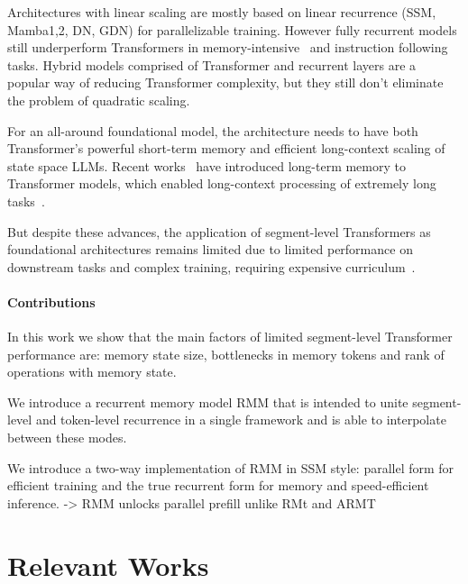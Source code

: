 \documentclass[11pt]{article}
\begin{document}
Architectures with linear scaling are mostly based on linear recurrence (SSM, Mamba1,2, DN, GDN) for parallelizable training. However fully recurrent models still underperform Transformers in memory-intensive~\citep{state tracking, copying} and instruction following~\citep{Can Mamba Learn How to Learn} tasks. Hybrid models comprised of Transformer and recurrent layers are a popular way of reducing Transformer complexity, but they still don't eliminate the problem of quadratic scaling.

For an all-around foundational model, the architecture needs to have both Transformer's powerful short-term memory and efficient long-context scaling of state space LLMs. Recent works~\citep{TrXL, Compressive, Memformer, RMT} have introduced long-term memory to Transformer models, which enabled long-context processing of extremely long tasks~\citep{Scaling RMT}. 

But despite these advances, the application of segment-level Transformers as foundational architectures remains limited due to limited performance on downstream tasks and complex training, requiring expensive curriculum~\citep{kuzmin2026extending}. 

\paragraph{Contributions}

In this work we show that the main factors of limited segment-level Transformer performance are: memory state size, bottlenecks in memory tokens and rank of operations with memory state. 

We introduce a recurrent memory model RMM that is intended to unite segment-level and token-level recurrence in a single framework and is able to interpolate between these modes. 

We introduce a two-way implementation of RMM in SSM style: parallel form for efficient training and the true recurrent form for memory and speed-efficient inference. -> RMM unlocks parallel prefill unlike RMt and ARMT



\section{Relevant Works}
\end{document}
